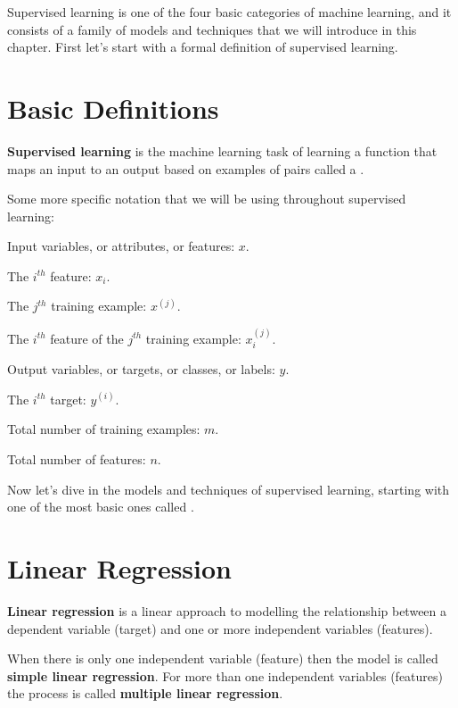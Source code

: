Supervised learning is one of the four basic categories of machine learning, and it consists of a family of models
and techniques that we will introduce in this chapter. First let's start with a formal definition of supervised
learning.

\section{Basic Definitions}

\textbf{Supervised learning} is the machine learning task of learning a function that maps an input to an output
based on examples of  pairs called a .
\ed


Some more specific notation that we will be using throughout supervised learning:
\bit
\item Input variables, or attributes, or features: $x$.
\item The $i^{th}$ feature: $x_{i}$.
\item The $j^{th}$ training example: $x^{(j)}$.
\item The $i^{th}$ feature of the $j^{th}$ training example: $x_{i}^{(j)}$.
\item Output variables, or targets, or classes, or labels: $y$.
\item The $i^{th}$ target: $y^{(i)}$.
\item Total number of training examples: $m$.
\item Total number of features: $n$.
\eit

Now let's dive in the models and techniques of supervised learning, starting with one of the most basic ones called
.

\section{Linear Regression}

\textbf{Linear regression} is a linear approach to modelling the relationship between a dependent variable (target)
and one or more independent variables (features).
\ed

When there is only one independent variable (feature) then the model is called \textbf{simple linear regression}. For
more than one independent variables (features) the process is called \textbf{multiple linear regression}.
\ed

